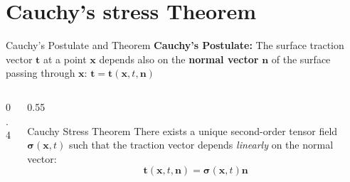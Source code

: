 \documentclass[aspectratio=169]{beamer}
\begin{document}
\section{Cauchy's stress Theorem}
\begin{frame}{Cauchy's Postulate and Theorem}
    \textbf{Cauchy's Postulate:} The surface traction vector $\bm{t}$ at a point $\bm{x}$ depends also on the \textbf{normal vector} $\bm{n}$ of the surface passing through $\bm{x}$: $ \bm{t} = \bm{t}(\bm{x}, t, \bm{n}) $
    \begin{columns}
        \begin{column}{0.4\textwidth}

            \vspace{1cm}
            

            \begin{center}
            \end{center}
        \end{column}
        \begin{column}{0.55\textwidth}
            \begin{block}{Cauchy Stress Theorem}
                There exists a unique second-order tensor field $\bm{\sigma}(\bm{x}, t)$ such that the traction vector depends \textit{linearly} on the normal vector:
                $$ \bm{t}(\bm{x}, t, \bm{n}) = \bm{\sigma}(\bm{x}, t) \bm{n} $$
            \end{block}
        \end{column}
    \end{columns}
\end{frame}
\end{document}
